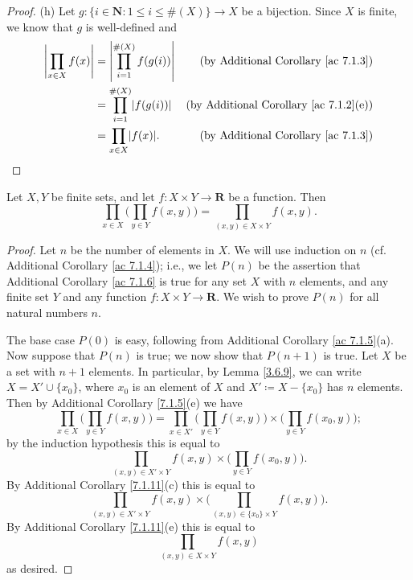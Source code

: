 \begin{proof}{(h)}
    Let \(g : \{i \in \mathbf{N} : 1 \leq i \leq \#(X)\} \to X\) be a bijection.
    Since \(X\) is finite, we know that \(g\) is well-defined and
    \begin{align*}
        \abs*{\prod_{x \in X} f(x)} & = \abs*{\prod_{i = 1}^{\#(X)} f(g(i))} & \text{(by Additional Corollary \ref{ac 7.1.3})}    \\
                                    & = \prod_{i = 1}^{\#(X)} \abs*{f(g(i))} & \text{(by Additional Corollary \ref{ac 7.1.2}(e))} \\
                                    & = \prod_{x \in X} \abs*{f(x)}.         & \text{(by Additional Corollary \ref{ac 7.1.3})}
    \end{align*}
\end{proof}

\begin{additional corollary}\label{ac 7.1.6}
Let \(X, Y\) be finite sets, and let \(f : X \times Y \to \mathbf{R}\) be a function.
Then
\[
    \prod_{x \in X} \bigg(\prod_{y \in Y} f(x, y)\bigg) = \prod_{(x, y) \in X \times Y} f(x, y).
\]
\end{additional corollary}

\begin{proof}
    Let \(n\) be the number of elements in \(X\).
    We will use induction on \(n\) (cf. Additional Corollary \ref{ac 7.1.4});
    i.e., we let \(P(n)\) be the assertion that Additional Corollary \ref{ac 7.1.6} is true for any set \(X\) with \(n\) elements, and any finite set \(Y\) and any function \(f : X \times Y \to \mathbf{R}\).
    We wish to prove \(P(n)\) for all natural numbers \(n\).

    The base case \(P(0)\) is easy, following from Additional Corollary \ref{ac 7.1.5}(a).
    Now suppose that \(P(n)\) is true;
    we now show that \(P(n + 1)\) is true.
    Let \(X\) be a set with \(n + 1\) elements.
    In particular, by Lemma \ref{3.6.9}, we can write \(X = X' \cup \{x_0\}\), where \(x_0\) is an element of \(X\) and \(X' \coloneqq X - \{x_0\}\) has \(n\) elements.
    Then by Additional Corollary \ref{7.1.5}(e) we have
    \[
        \prod_{x \in X} \bigg(\prod_{y \in Y} f(x, y)\bigg) = \prod_{x \in X'} \bigg(\prod_{y \in Y} f(x, y)\bigg) \times \bigg(\prod_{y \in Y} f(x_0, y)\bigg);
    \]
    by the induction hypothesis this is equal to
    \[
        \prod_{(x, y) \in X' \times Y} f(x, y) \times \bigg(\prod_{y \in Y} f(x_0, y)\bigg).
    \]
    By Additional Corollary \ref{7.1.11}(c) this is equal to
    \[
        \prod_{(x, y) \in X' \times Y} f(x, y) \times \bigg(\prod_{(x, y) \in \{x_0\} \times Y} f(x, y)\bigg).
    \]
    By Additional Corollary \ref{7.1.11}(e) this is equal to
    \[
        \prod_{(x, y) \in X \times Y} f(x, y)
    \]
    as desired.
\end{proof}


